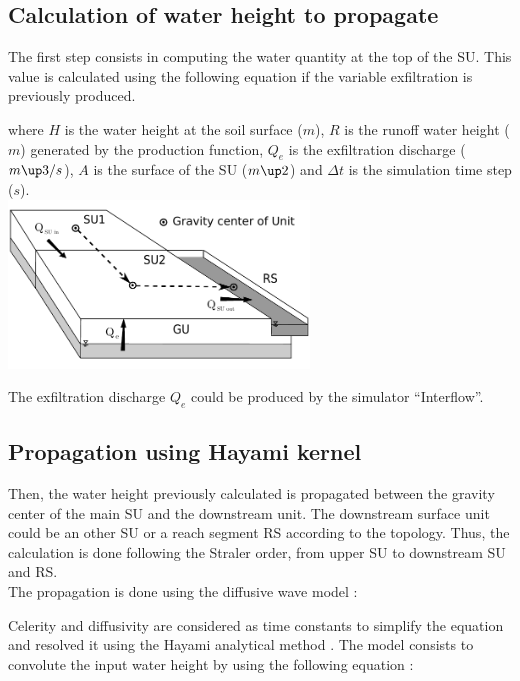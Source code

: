 \subsection{Calculation of water height to propagate}
The first step consists in computing the water quantity at the top of the SU. This value is calculated using the following equation if the variable exfiltration is previously produced.



where $H$ is the water height at the soil surface ($m$), $R$ is the runoff water height ($m$) generated by the production function, $Q_e$ is the exfiltration discharge ($m\up3/s$), $A$ is the surface of the SU ($m\up2$) and $\Delta t$ is the simulation time step ($s$).\\

\includegraphics[width=8cm]{doc/common/Schema_GU_RS_SU_Hayami_SU.pdf}

The exfiltration discharge $Q_e$ could be produced by the simulator ``Interflow''.\\


\subsection{Propagation using Hayami kernel}
Then, the water height previously calculated is propagated between the gravity center of the main SU and the downstream unit. The downstream surface unit could be an other SU or a reach segment RS according to the topology. Thus, the calculation is done following the Straler order, from upper SU to downstream SU and RS.\\

The propagation is done using the diffusive wave model :



Celerity and diffusivity are considered as time constants to simplify the equation and resolved it using the Hayami analytical method \cite{Moussa1996}. The model consists to convolute the input water height by using the following equation :

